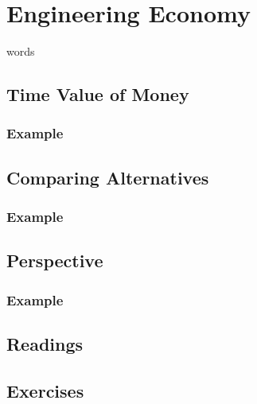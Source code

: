 \section{Engineering Economy}
words
\subsection{Time Value of Money}
\subsubsection{Example}
\subsection{Comparing Alternatives}
\subsubsection{Example}
\subsection{Perspective}
\subsubsection{Example}
\subsection{Readings}
\subsection{Exercises}